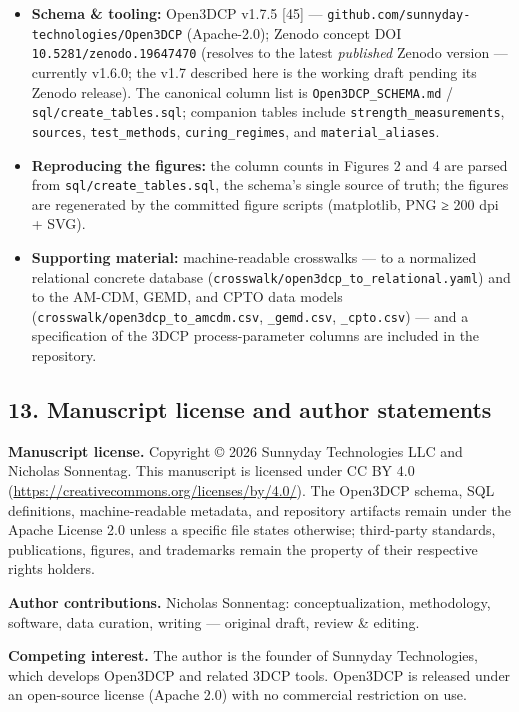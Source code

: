\documentclass[
  11pt,
  letterpaper,
]{article}
\providecommand{\tightlist}{%
  \setlength{\itemsep}{0pt}\setlength{\parskip}{0pt}}
\begin{document}
\begin{itemize}
\tightlist
\item
  \textbf{Schema \& tooling:} Open3DCP v1.7.5 {[}45{]} ---
  \texttt{github.com/sunnyday-technologies/Open3DCP} (Apache-2.0);
  Zenodo concept DOI \texttt{10.5281/zenodo.19647470} (resolves to the
  latest \emph{published} Zenodo version --- currently v1.6.0; the v1.7
  described here is the working draft pending its Zenodo release). The
  canonical column list is \texttt{Open3DCP\_SCHEMA.md} /
  \texttt{sql/create\_tables.sql}; companion tables include
  \texttt{strength\_measurements}, \texttt{sources},
  \texttt{test\_methods}, \texttt{curing\_regimes}, and
  \texttt{material\_aliases}.
\item
  \textbf{Reproducing the figures:} the column counts in Figures 2 and 4
  are parsed from \texttt{sql/create\_tables.sql}, the schema's single
  source of truth; the figures are regenerated by the committed figure
  scripts (matplotlib, PNG ≥ 200 dpi + SVG).
\item
  \textbf{Supporting material:} machine-readable crosswalks --- to a
  normalized relational concrete database
  (\texttt{crosswalk/open3dcp\_to\_relational.yaml}) and to the AM-CDM,
  GEMD, and CPTO data models
  (\texttt{crosswalk/open3dcp\_to\_amcdm.csv}, \texttt{\_gemd.csv},
  \texttt{\_cpto.csv}) --- and a specification of the 3DCP
  process-parameter columns are included in the repository.
\end{itemize}

\subsection{13. Manuscript license and author
statements}\label{manuscript-license-and-author-statements}

\textbf{Manuscript license.} Copyright © 2026 Sunnyday Technologies LLC
and Nicholas Sonnentag. This manuscript is licensed under CC BY 4.0
(\url{https://creativecommons.org/licenses/by/4.0/}). The Open3DCP
schema, SQL definitions, machine-readable metadata, and repository
artifacts remain under the Apache License 2.0 unless a specific file
states otherwise; third-party standards, publications, figures, and
trademarks remain the property of their respective rights holders.

\textbf{Author contributions.} Nicholas Sonnentag: conceptualization,
methodology, software, data curation, writing --- original draft, review
\& editing.

\textbf{Competing interest.} The author is the founder of Sunnyday
Technologies, which develops Open3DCP and related 3DCP tools. Open3DCP
is released under an open-source license (Apache 2.0) with no commercial
restriction on use.
\end{document}
